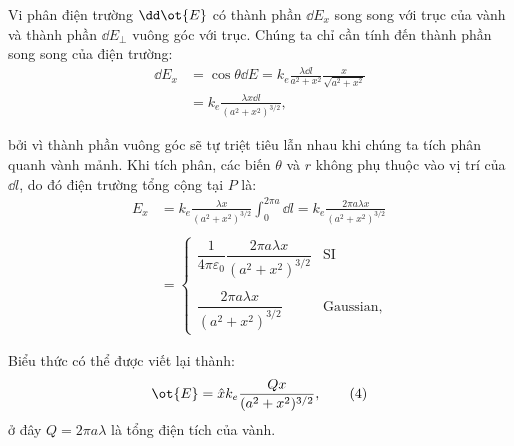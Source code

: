 \begin{loigiai}
\begin{center}
\begin{tikzpicture}[x=0.75pt,y=0.75pt,yscale=-1,xscale=1]
\end{tikzpicture}
\end{center}
Vi phân điện trường  $\dd \ot{E}$ có thành phần $\dd E_x$ song song với trục của vành và thành phần $\dd E_{\perp}$  vuông góc với trục. Chúng ta chỉ cần tính đến thành phần song song của điện trường:
\[\begin{aligned}
 \dd E_x & = \cos \theta \dd E = k_e \frac{\lambda \dd l}{a^2 + x^2} \frac{x}{\sqrt{a^2 + x^2}} \\
    &= k_e \frac{\lambda x \dd l}{(a^2 + x^2)^{3/2}} , \end{aligned} \tag{2}\]

bởi vì thành phần vuông góc sẽ tự triệt tiêu lẫn nhau khi chúng ta tích phân quanh vành mảnh. Khi tích phân, các biến $\theta$ và $r$ không phụ thuộc vào vị trí của $\dd l$, do đó điện trường tổng cộng tại $P$ là:
  \[\begin{aligned} E_x &= k_e \frac{\lambda x}{(a^2 + x^2)^{3/2}} \int_{0}^{2\pi a} \dd l = k_e  \frac{2\pi a \lambda x}{(a^2 +x^2)^{3/2}} \\
  \\
                &= \left\{ \begin{array}{cc} \dfrac{1}{4\pi \varepsilon_0} \dfrac{2\pi a \lambda x}{(a^2+x^2)^{3/2}}   & \text{SI} \\
                \\
                 \dfrac{2\pi a \lambda x}{(a^2+x^2)^{3/2}}  & \text{Gaussian}, \end{array} \right.  \end{aligned} \tag{3} \]

Biểu thức có thể được viết lại thành: 
     \[  \ot{E} = \hat{{x}} k_e \frac{Qx}{(a^2 + x^2)^{3/2}}, \tag{4} \]
ở đây $Q=2\pi a \lambda$ là tổng điện tích của vành.
   \begin{center}



\begin{tikzpicture}[x=0.75pt,y=0.75pt,yscale=-1,xscale=1]


\end{tikzpicture}
\end{center}
\end{loigiai}
